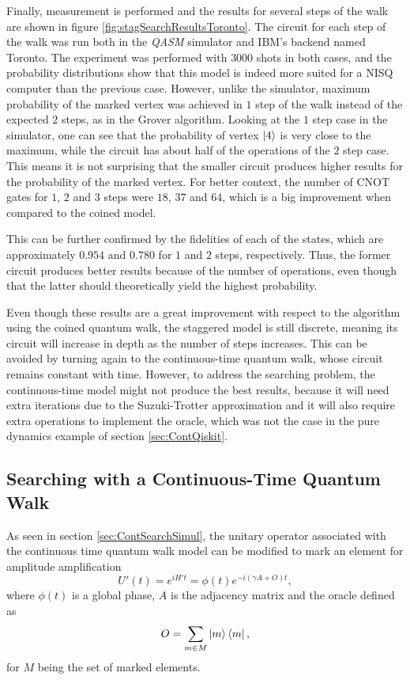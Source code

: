 \documentclass[../../dissertation.tex]{subfiles}
\begin{document}
Finally, measurement is performed and the results for several steps of the walk
are shown in figure \ref{fig:stagSearchResultsToronto}.  The circuit for each
step of the walk was run both in the \textit{QASM} simulator and IBM's backend
named Toronto. The experiment was performed with $3000$ shots in both cases,
and the probability distributions show that this model is indeed more suited
for a NISQ computer than the previous case.  However, unlike the simulator,
maximum probability of the marked vertex was achieved in $1$ step of the walk
instead of the expected $2$ steps, as in the Grover algorithm. Looking at the
$1$ step case in the simulator, one can see that the probability of vertex
$\ket{4}$ is very close to the maximum, while the circuit has about half of the
operations of the $2$ step case. This means it is not surprising that the
smaller circuit produces higher results for the probability of the marked
vertex. For better context, the number of CNOT gates for $1$, $2$ and $3$ steps were $18$, $37$ and $64$, which is a big improvement when compared to the coined model.\par
This can be further confirmed by the fidelities of each of the states, which
are approximately $0.954$ and $0.780$ for $1$ and $2$ steps, respectively.
Thus, the former circuit produces better results because of the number of
operations, even though that the latter should theoretically yield the highest
probability.\par 

Even though these results are a great improvement with respect to the algorithm using
the coined quantum walk, the staggered model is still discrete, meaning its
circuit will increase in depth as the number of steps increases. This can be
avoided by turning again to the continuous-time quantum walk, whose circuit
remains constant with time.  However, to address the searching problem, the
continuous-time model might not produce the best results, because it will need extra
iterations due to the Suzuki-Trotter approximation and it will also require
extra operations to implement the oracle, which was not the case in the pure
dynamics example of section \ref{sec:ContQiskit}.

\subsection{Searching with a Continuous-Time Quantum Walk}
As seen in section \ref{sec:ContSearchSimul}, the unitary operator
associated with the continuous time quantum walk model can be modified to
mark an element for amplitude amplification
\begin{equation}
	U'(t) = e^{iH't} = \phi(t)e^{-i(\gamma A+O)t},
	\label{eq:qiskitU'}
\end{equation}
where $\phi(t)$ is a global phase, $A$ is the adjacency matrix and the oracle defined as 
\begin{equation}
	O = \sum_{m \in M} \ket{m}\bra{m},
\end{equation}
for $M$ being the set of marked elements.\par
\end{document}
